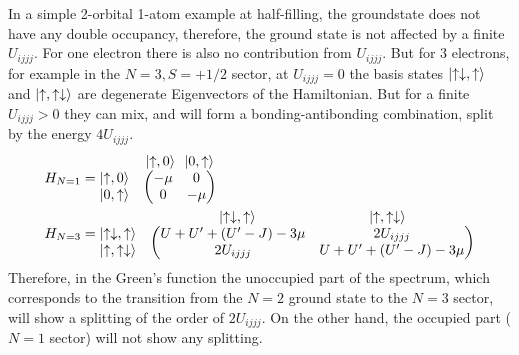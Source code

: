 \documentclass[12pt,a4paper]{scrartcl}
\numberwithin{equation}{section}
\begin{document}
In a simple 2-orbital 1-atom example at half-filling, the groundstate does not have any double occupancy,
therefore, the ground state is not affected by a finite $U_{ijjj}$.
For one electron there is also no contribution from $U_{ijjj}$.
But for 3 electrons, for example in the $N=3, S=+1/2$ sector,
at $U_{ijjj}=0$ the basis states $\ket{\uparrow\downarrow, \uparrow}$ and $\ket{\uparrow, \uparrow\downarrow}$ are degenerate Eigenvectors
of the Hamiltonian.
But for a finite $U_{ijjj}>0$ they can mix, and will form a bonding-antibonding combination,
split by the energy $4U_{ijjj}$. 
\begin{align}
H_{N=1} &=
 \begin{matrix}  & \ket{\uparrow,0} \mbox{ } \ket{0,\uparrow} \\
 \begin{matrix} \ket{\uparrow,0} \\ \ket{0, \uparrow} \end{matrix} &
 \begin{pmatrix}
  -\mu & 0 \\
  0 & -\mu 
 \end{pmatrix}
 \end{matrix} \\
%
H_{N=3} &=
 \begin{matrix}  & \ket{\uparrow\downarrow, \uparrow} \mbox{ \hspace*{2.5cm} } \ket{\uparrow, \uparrow\downarrow} \\
 \begin{matrix} \ket{\uparrow\downarrow, \uparrow} \\ \ket{\uparrow, \uparrow\downarrow} \end{matrix} &
 \begin{pmatrix}
  U+U'+(U'-J)-3\mu & 2U_{ijjj} \\
  2U_{ijjj} & U+U'+(U'-J)-3\mu 
 \end{pmatrix}
 \end{matrix}
\end{align}
Therefore, in the Green's function the unoccupied part of the spectrum, which corresponds to the transition from
the $N=2$ ground state to the $N=3$ sector, will show a splitting of the order of $2U_{ijjj}$.
On the other hand, the occupied part ($N=1$ sector) will not show any splitting.
\end{document}
